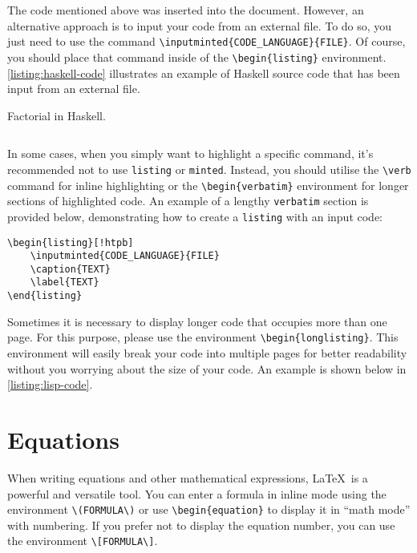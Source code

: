{	%

	The code mentioned above was inserted into the document. However, an alternative approach is to input your code from an external file. To do so, you just need to use the command \verb|\inputminted{CODE_LANGUAGE}{FILE}|. Of course, you should place that command inside of the \verb|\begin{listing}| environment. \autoref{listing:haskell-code} illustrates an example of Haskell source code that has been input from an external file.

	\begin{listing}[!htpb]
		\caption{Factorial in Haskell.}
		\label{listing:haskell-code}
		\inputminted{haskell}{Code/Factorial.hs}
	\end{listing}

	In some cases, when you simply want to highlight a specific command, it's recommended not to use \verb|listing| or \verb|minted|. Instead, you should utilise the \verb|\verb| command for inline highlighting or the \verb|\begin{verbatim}| environment for longer sections of highlighted code. An example of a lengthy \verb|verbatim| section is provided below, demonstrating how to create a \verb|listing| with an input code:

	\begin{verbatim}
\begin{listing}[!htpb]
    \inputminted{CODE_LANGUAGE}{FILE}
    \caption{TEXT}
    \label{TEXT}
\end{listing}
\end{verbatim}

	Sometimes it is necessary to display longer code that occupies more than one page. For this purpose, please use the environment \verb|\begin{longlisting}|. This environment will easily break your code into multiple pages for better readability without you worrying about the size of your code. An example is shown below in \autoref{listing:lisp-code}.

	\section{Equations}
	When writing equations and other mathematical expressions, \LaTeX~is a powerful and versatile tool. You can enter a formula in inline mode using the environment \verb|\(FORMULA\)| or use \verb|\begin{equation}| to display it in ``math mode'' with numbering. If you prefer not to display the equation number, you can use the environment \verb|\[FORMULA\]|.

}
